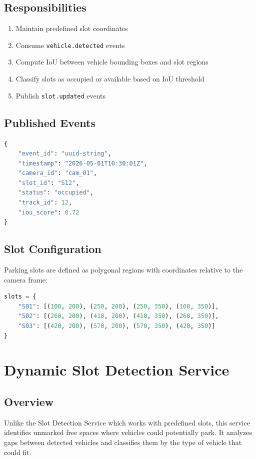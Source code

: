\documentclass[12pt,a4paper]{report}
\begin{document}
\subsection{Responsibilities}
\begin{enumerate}
    \item Maintain predefined slot coordinates
    \item Consume \texttt{vehicle.detected} events
    \item Compute IoU between vehicle bounding boxes and slot regions
    \item Classify slots as occupied or available based on IoU threshold
    \item Publish \texttt{slot.updated} events
\end{enumerate}

\subsection{Published Events}
\begin{lstlisting}[language=Python, caption=slot.updated.v1 Event Schema]
{
    "event_id": "uuid-string",
    "timestamp": "2026-05-01T10:30:01Z",
    "camera_id": "cam_01",
    "slot_id": "S12",
    "status": "occupied",
    "track_id": 12,
    "iou_score": 0.72
}
\end{lstlisting}

\subsection{Slot Configuration}
Parking slots are defined as polygonal regions with coordinates relative to the camera frame:
\begin{lstlisting}[language=Python, caption=Slot Definition Example]
slots = {
    "S01": [(100, 200), (250, 200), (250, 350), (100, 350)],
    "S02": [(260, 200), (410, 200), (410, 350), (260, 350)],
    "S03": [(420, 200), (570, 200), (570, 350), (420, 350)]
}
\end{lstlisting}


\section{Dynamic Slot Detection Service}

\subsection{Overview}
Unlike the Slot Detection Service which works with predefined slots, this service identifies unmarked free spaces where vehicles could potentially park. It analyzes gaps between detected vehicles and classifies them by the type of vehicle that could fit.
\end{document}
